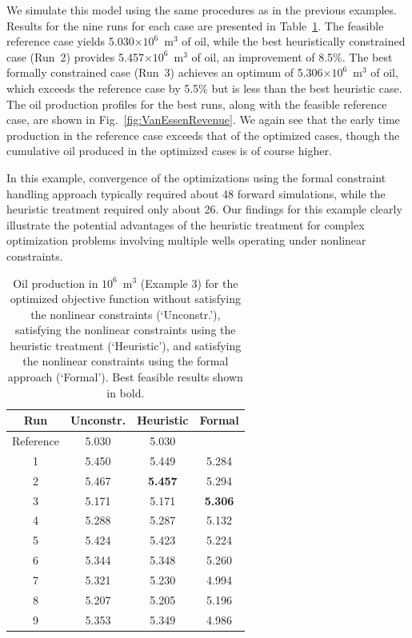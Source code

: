 \documentclass[twocolumn,numbook]{svjour3}          %
\begin{document}
We simulate this model using the same procedures as in the previous examples.
Results for the nine runs for each case are presented in
Table~\ref{table:vanessen}. The feasible reference case yields 5.030$\times 10^6$~m$^3$ of
oil, while the best heuristically constrained case (Run~2) provides 5.457$\times 10^6$~m$^3$
of oil, an improvement of 8.5\%. The best formally constrained case (Run~3)
achieves an optimum of 5.306$\times 10^6$~m$^3$ of oil, which exceeds the reference case by
5.5\% but is less than the best heuristic case. The oil production profiles
for the best runs, along with the feasible reference case, are shown in
Fig.~\ref{fig:VanEssenRevenue}. We again see that the early time production in
the reference case exceeds that of the optimized cases, though the cumulative
oil produced in the optimized cases is of course higher. 

In this example, convergence of the optimizations using the formal constraint handling approach 
typically required about 48 forward simulations, while the heuristic treatment required only about 26. Our findings for this example clearly illustrate the potential advantages of the heuristic treatment for complex optimization problems involving multiple wells operating under nonlinear constraints.



\begin{table}
\centering
\caption{Oil production in $10^6$~m$^3$ (Example 3) for the optimized objective function
         without satisfying the nonlinear constraints (`Unconstr.'), satisfying the nonlinear constraints
         using the heuristic treatment (`Heuristic'), and satisfying the nonlinear constraints
         using the formal approach (`Formal'). Best feasible results shown in bold.}
\begin{tabular}{|c|c|c|c|}
\hline
 Run              & Unconstr. & Heuristic & Formal     \\
\hline
Reference         & 5.030 &  5.030    &          \\
1 & 5.450 &  5.449   &  5.284   \\
2 & 5.467 &\bf{5.457} &  5.294   \\
3 & 5.171 &  5.171   &\bf{5.306}\\
4 & 5.288 &  5.287   &  5.132   \\
5 & 5.424 &  5.423   &  5.224   \\
6 & 5.344 &  5.348   &  5.260   \\
7 & 5.321 &  5.230   &  4.994   \\
8 & 5.207 &  5.205   &  5.196   \\
9 & 5.353 &  5.349   &  4.986   \\
\hline
\end{tabular}
  \label{table:vanessen}
\end{table}
\end{document}
